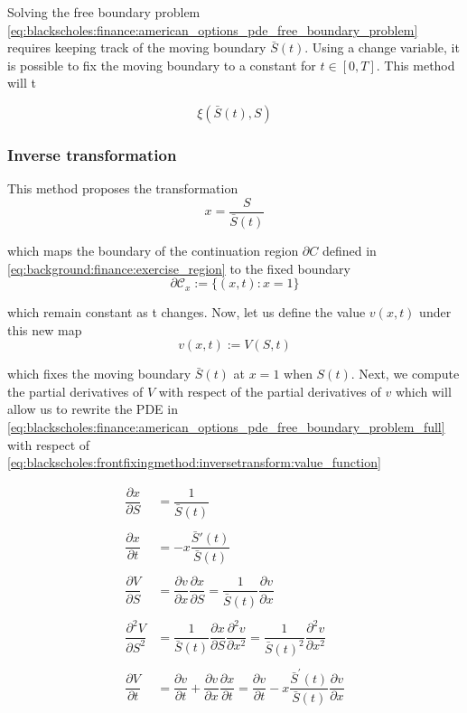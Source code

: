 Solving the free boundary problem \eqref{eq:blackscholes:finance:american_options_pde_free_boundary_problem}
requires keeping track of the moving boundary $\bar{S}(t)$. Using a change variable, 
it is possible to fix the moving boundary to a constant for 
$t \in [0, T]$. This method will t

\begin{equation}
  \xi(\bar{S}(t), S)
\end{equation}

\subsubsection{Inverse transformation}

This method proposes the transformation 
\begin{equation}
    x = \dfrac{S}{\bar{S}(t)}
    \label{eq:blackscholes:frontfixingmethod:inversetransform}
\end{equation}

which maps the boundary of the continuation region $\partial C$ defined in 
\eqref{eq:background:finance:exercise_region} to the fixed boundary 
\begin{equation}
  \mathcal{\partial C}_x := \{(x, t): x = 1\} 
\end{equation}

which remain constant as t changes. Now, let us define the value $v(x,t)$ 
under this new map
\begin{equation}
  v(x, t) := V(S, t)
  \label{eq:blackscholes:frontfixingmethod:inversetransform:value_function}
\end{equation}

which fixes the moving boundary $\bar{S}(t)$ at $x=1$ when $S(t)$. Next, we compute
the partial derivatives of $V$ with respect of the partial derivatives of $v$ which
will allow us to rewrite the PDE in \eqref{eq:blackscholes:finance:american_options_pde_free_boundary_problem_full} 
with respect of \eqref{eq:blackscholes:frontfixingmethod:inversetransform:value_function}

\begin{align*}
  \dfrac{\partial{x}}{\partial{S}} &= \dfrac{1}{\bar{S}(t)} \\\\
  \dfrac{\partial{x}}{\partial{t}} &= -x\dfrac{\bar{S}'(t)}{\bar{S}(t)} \\\\
  \dfrac{\partial{V}}{\partial{S}} &= \dfrac{\partial{v}}{\partial{x}}\dfrac{\partial{x}}{\partial{S}} = \dfrac{1}{\bar{S}(t)}\dfrac{\partial{v}}{\partial{x}} \\\\
  \dfrac{\partial^2{V}}{\partial{S^2}} &= \dfrac{1}{\bar{S}(t)} \dfrac{\partial{x}}{\partial{S}} \dfrac{\partial^2{v}}{\partial{x^2}} = \dfrac{1}{\bar{S}(t)^2} \dfrac{\partial^2{v}}{\partial{x}^2} \\\\
  \dfrac{\partial{V}}{\partial{t}} &=  \dfrac{\partial{v}}{\partial{t}} + \dfrac{\partial{v}}{\partial{x}} \dfrac{\partial{x}}{\partial{t}} = \dfrac{\partial{v}}{\partial{t}} - x\dfrac{\bar{S}^\prime(t)}{\bar{S}(t)}\dfrac{\partial{v}}{\partial{x}}
\end{align*}

